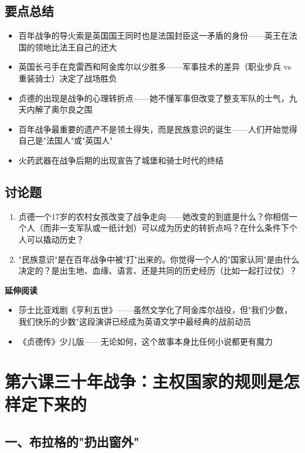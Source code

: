 \documentclass[a4paper,12pt]{ctexart}
\begin{document}
\subsection*{要点总结}
\begin{itemize}
  \item 百年战争的导火索是英国国王同时也是法国封臣这一矛盾的身份——英王在法国的领地比法王自己的还大
  \item 英国长弓手在克雷西和阿金库尔以少胜多——军事技术的差异（职业步兵 vs 重装骑士）决定了战场胜负
  \item 贞德的出现是战争的心理转折点——她不懂军事但改变了整支军队的士气，九天内解了奥尔良之围
  \item 百年战争最重要的遗产不是领土得失，而是民族意识的诞生——人们开始觉得自己是"法国人"或"英国人"
  \item 火药武器在战争后期的出现宣告了城堡和骑士时代的终结
\end{itemize}

\subsection*{讨论题}
\begin{enumerate}
  \item 贞德一个17岁的农村女孩改变了战争走向——她改变的到底是什么？你相信一个人（而非一支军队或一纸计划）可以成为历史的转折点吗？在什么条件下个人可以撬动历史？
  \item "民族意识"是在百年战争中被"打"出来的。你觉得一个人的"国家认同"是由什么决定的？是出生地、血缘、语言、还是共同的历史经历（比如一起打过仗）？
\end{enumerate}

\vspace{0.3cm}
\textcolor{blue!70!black}{\textbf{延伸阅读}}
\begin{itemize}
  \item 莎士比亚戏剧《亨利五世》——虽然文学化了阿金库尔战役，但"我们少数，我们快乐的少数"这段演讲已经成为英语文学中最经典的战前动员
  \item 《贞德传》少儿版——无论如何，这个故事本身比任何小说都更有魔力
\end{itemize}

\newpage

\section{\textcolor{orange!80!black}{第六课\quad 三十年战争：主权国家的规则是怎样定下来的}}

\subsection*{一、布拉格的"扔出窗外"}
\end{document}
